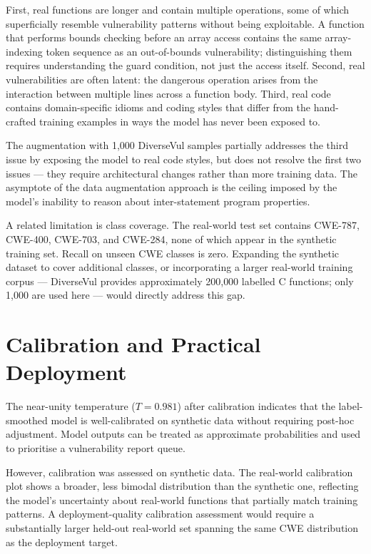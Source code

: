 First, real functions are longer and contain multiple operations, some of which superficially
resemble vulnerability patterns without being exploitable.
A function that performs bounds checking before an array access contains the same
array-indexing token sequence as an out-of-bounds vulnerability; distinguishing them
requires understanding the guard condition, not just the access itself.
Second, real vulnerabilities are often latent: the dangerous operation arises from the
interaction between multiple lines across a function body.
Third, real code contains domain-specific idioms and coding styles that differ from the
hand-crafted training examples in ways the model has never been exposed to.

The augmentation with 1{,}000 DiverseVul samples partially addresses the third issue
by exposing the model to real code styles, but does not resolve the first two issues ---
they require architectural changes rather than more training data.
The asymptote of the data augmentation approach is the ceiling imposed by the model's
inability to reason about inter-statement program properties.

A related limitation is class coverage.
The real-world test set contains CWE-787, CWE-400, CWE-703, and CWE-284, none of which
appear in the synthetic training set.
Recall on unseen CWE classes is zero.
Expanding the synthetic dataset to cover additional classes, or incorporating a larger
real-world training corpus --- DiverseVul provides approximately 200{,}000 labelled
C functions; only 1{,}000 are used here --- would directly address this gap.

\section{Calibration and Practical Deployment}

The near-unity temperature ($T = 0.981$) after calibration indicates that the
label-smoothed model is well-calibrated on synthetic data without requiring post-hoc
adjustment.
Model outputs can be treated as approximate probabilities and used to prioritise a
vulnerability report queue.

However, calibration was assessed on synthetic data.
The real-world calibration plot shows a broader, less bimodal distribution than the
synthetic one, reflecting the model's uncertainty about real-world functions that partially
match training patterns.
A deployment-quality calibration assessment would require a substantially larger held-out
real-world set spanning the same CWE distribution as the deployment target.

